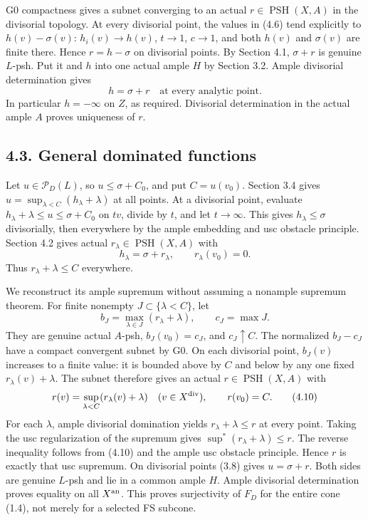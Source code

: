\documentclass[
  10pt,
]{article}
\begin{document}
G0 compactness gives a subnet converging to an actual
\(r\in\operatorname{PSH}(X,A)\) in the divisorial topology. At every
divisorial point, the values in (4.6) tend explicitly to
\(h(v)-\sigma(v)\): \(h_i(v)\to h(v)\), \(t\to1\), \(c\to1\), and both
\(h(v)\) and \(\sigma(v)\) are finite there. Hence \(r=h-\sigma\) on
divisorial points. By Section 4.1, \(\sigma+r\) is genuine \(L\)-psh.
Put it and \(h\) into one actual ample \(H\) by Section 3.2. Ample
divisorial determination gives
\[h=\sigma+r\quad\text{at every analytic point}.\tag{4.7}\] In
particular \(h=-\infty\) on \(Z\), as required. Divisorial determination
in the actual ample \(A\) proves uniqueness of \(r\).

\subsection{4.3. General dominated
functions}\label{general-dominated-functions}

Let \(u\in\mathcal P_D(L)\), so \(u\leq\sigma+C_0\), and put
\(C=u(v_0)\). Section 3.4 gives
\(u=\sup_{\lambda<C}(h_\lambda+\lambda)\) at all points. At a divisorial
point, evaluate \(h_\lambda+\lambda\leq u\leq\sigma+C_0\) on \(tv\),
divide by \(t\), and let \(t\to\infty\). This gives
\(h_\lambda\leq\sigma\) divisorially, then everywhere by the ample
embedding and usc obstacle principle. Section 4.2 gives actual
\(r_\lambda\in\operatorname{PSH}(X,A)\) with
\[h_\lambda=\sigma+r_\lambda,\qquad r_\lambda(v_0)=0.\tag{4.8}\] Thus
\(r_\lambda+\lambda\leq C\) everywhere.

We reconstruct its ample supremum without assuming a nonample supremum
theorem. For finite nonempty \(J\subset\{\lambda<C\}\), let
\[b_J=\max_{\lambda\in J}(r_\lambda+\lambda),\qquad c_J=\max J.\tag{4.9}\]
They are genuine actual \(A\)-psh, \(b_J(v_0)=c_J\), and
\(c_J\uparrow C\). The normalized \(b_J-c_J\) have a compact convergent
subnet by G0. On each divisorial point, \(b_J(v)\) increases to a finite
value: it is bounded above by \(C\) and below by any one fixed
\(r_\lambda(v)+\lambda\). The subnet therefore gives an actual
\(r\in\operatorname{PSH}(X,A)\) with
\[r(v)=\sup_{\lambda<C}(r_\lambda(v)+\lambda)\quad(v\in X^{\rm div}),\qquad r(v_0)=C.\tag{4.10}\]
For each \(\lambda\), ample divisorial domination yields
\(r_\lambda+\lambda\leq r\) at every point. Taking the usc
regularization of the supremum gives
\(\sup^*(r_\lambda+\lambda)\leq r\). The reverse inequality follows from
(4.10) and the ample usc obstacle principle. Hence \(r\) is exactly that
usc supremum. On divisorial points (3.8) gives \(u=\sigma+r\). Both
sides are genuine \(L\)-psh and lie in a common ample \(H\). Ample
divisorial determination proves equality on all \(X^{\rm an}\). This
proves surjectivity of \(F_D\) for the entire cone (1.4), not merely for
a selected FS subcone.
\end{document}
